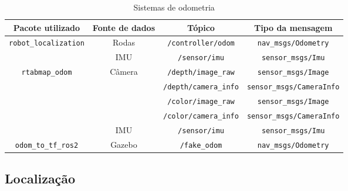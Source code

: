 \documentclass[repeatfields,xlists,xpacks,oneside,yearsonly]{ufrgscca}
\begin{document}
\begin{table}[h]
    \begin{center}
        \caption{Sistemas de odometria}
        \label{tab:odometria}
        \small
        \begin{tabularx}{\linewidth}{c|c|c|c}
            Pacote utilizado                              & Fonte de dados          & Tópico                       & Tipo da mensagem                 \\
            \hline
            \multirow{2}{*}{\texttt{robot\_localization}} & Rodas                   & \texttt{/controller/odom}    & \texttt{nav\_msgs/Odometry}      \\
                                                          & IMU                     & \texttt{/sensor/imu}         & \texttt{sensor\_msgs/Imu}        \\
            \hline
            \multirow{5}{*}{\texttt{rtabmap\_odom}}       & \multirow{4}{*}{Câmera} & \texttt{/depth/image\_raw}   & \texttt{sensor\_msgs/Image}      \\
                                                          &                         & \texttt{/depth/camera\_info} & \texttt{sensor\_msgs/CameraInfo} \\
                                                          &                         & \texttt{/color/image\_raw}   & \texttt{sensor\_msgs/Image}      \\
                                                          &                         & \texttt{/color/camera\_info} & \texttt{sensor\_msgs/CameraInfo} \\
                                                          & IMU                     & \texttt{/sensor/imu}         & \texttt{sensor\_msgs/Imu}        \\
            \hline
            \texttt{odom\_to\_tf\_ros2}                   & Gazebo                  & \texttt{/fake\_odom}         & \texttt{nav\_msgs/Odometry}      \\
        \end{tabularx}
    \end{center}
\end{table}

\subsection{Localização}
\label{met:localizacao}
\end{document}
